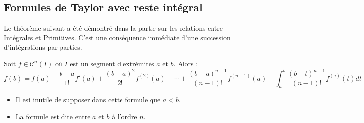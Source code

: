 \subsection{Formules de Taylor avec reste intégral}
Le théorème suivant a été démontré dans la partie sur les relations entre \href{\baseurl C2190.pdf}{Intégrales et Primitives}. C'est une conséquence immédiate d'une succession d'intégrations par parties.
\begin{prop}
 Soit $f\in \mathcal C^{n}(I)$ où $I$ est un segment d'extrémités $a$ et $b$. Alors :
\begin{displaymath}
 f(b)= f(a)+\frac{b-a}{1!}f'(a)+\frac{(b-a)^2}{2!}f^{(2)}(a) + \cdots +
\frac{(b-a)^{n-1}}{(n-1)!}f^{(n-1)}(a) +
\int_{a}^{b}\frac{(b-t)^{n-1}}{(n-1)!}f^{(n)}(t)dt
\end{displaymath}
\end{prop}
\begin{rems}
\begin{itemize}
\item  Il est inutile de supposer dans cette formule que $a<b$.
\item La formule est dite entre $a$ et $b$ à l'ordre $n$. 
\end{itemize}
\end{rems}

